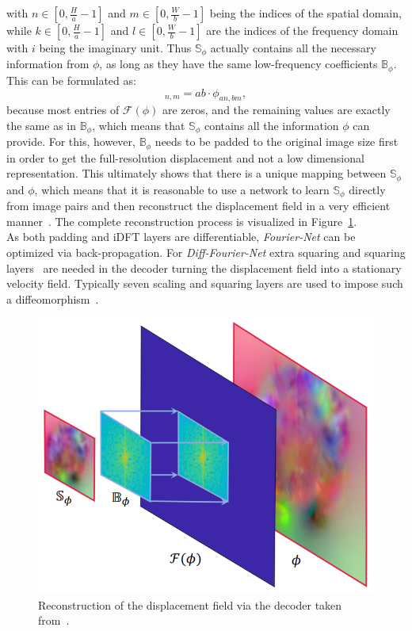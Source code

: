with $n \in [0, \frac{H}{a}-1]$ and $m \in [0, \frac{W}{b}-1]$ being the indices of the spatial domain, while $k \in [0, \frac{H}{a}-1]$ and $l \in [0, \frac{W}{b}-1]$ are the indices of the frequency domain with $i$ being the imaginary unit. Thus $\mathbb{S}_\phi$ actually contains all the necessary information from $\phi$, as long as they have the same low-frequency coefficients $\mathbb{B}_\phi$. This can be formulated as:
\begin{equation}
	[\mathbb{S}_\phi]_{n,m} = ab \cdot \phi_{an,bm},
\end{equation}
because most entries of $\mathcal{F}(\phi)$ are zeros, and the remaining values are exactly the same as in $\mathbb{B}_\phi$, which means that $\mathbb{S}_\phi$ contains all the information $\phi$ can provide. For this, however, $\mathbb{B}_\phi$ needs to be padded to the original image size first in order to get the full-resolution displacement and not a low dimensional representation. This ultimately shows that there is a unique mapping between $\mathbb{S}_\phi$ and $\phi$, which means that it is reasonable to use a network to learn $\mathbb{S}_\phi$ directly from image pairs and then reconstruct the displacement field in a very efficient manner~\cite{Fourier-Net}. The complete reconstruction process is visualized in Figure~\ref{fig:DecoderDisplacementField}.\\
As both padding and iDFT layers are differentiable, \emph{Fourier-Net} can be optimized via back-propagation. For \emph{Diff-Fourier-Net} extra squaring and squaring layers~\cite{Dalca2018} are needed in the decoder turning the displacement field into a stationary velocity field. Typically seven scaling and squaring layers are used to impose such a diffeomorphism~\cite{Fourier-Net,Dalca2018}.
\begin{figure}[h] %
	\centering
	\graphicspath{{images/}{\main/images/}}
	\includegraphics[width=.65\linewidth]{DecoderDisplacementField.png} 
	\caption{Reconstruction of the displacement field via the decoder taken from~\cite{Fourier-Net+}.}
	\label{fig:DecoderDisplacementField}
\end{figure} 

